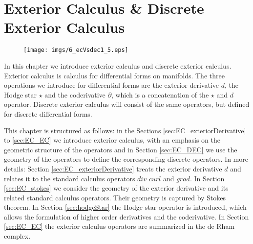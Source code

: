 \chapter{Exterior Calculus \& Discrete Exterior Calculus}
\label{chap:EC}

\begin{figure}[h]
\begin{center}
\texttt{[image: imgs/6\_ecVsdec1\_5.eps]}%
\end{center}
\end{figure}
In this chapter we introduce exterior calculus and discrete exterior calculus. Exterior calculus  is calculus for differential forms on manifolds. The three operations we introduce for differential forms are the exterior derivative $d$, the Hodge star $\star$ and the coderivative $\partial$, which is a concatenation of the $\star$ and $d$ operator. Discrete exterior calculus will consist of the same operators, but defined for discrete differential forms.

This chapter is structured as follows: in the Sections \ref{sec:EC_exteriorDerivative} to \ref{sec:EC_EC} we introduce exterior calculus, with an emphasis on the geometric structure of the operators and in Section \ref{sec:EC_DEC} we use the geometry of the operators to define the corresponding discrete operators. In more details: Section \ref{sec:EC_exteriorDerivative} treats the exterior derivative $d$ and relates it to the standard calculus operators $div$ $curl$ and $grad$. In Section \ref{sec:EC_stokes} we consider the geometry of the exterior derivative and its related standard calculus operators. Their geometry is captured by Stokes theorem. In Section \ref{sec:hodgeStar} the Hodge star operator is introduced, which allows the formulation of higher order derivatives and the coderivative. In Section \ref{sec:EC_EC} the exterior calculus operators are summarized in the de Rham complex. 

